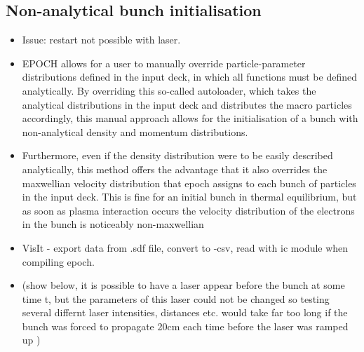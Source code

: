 
\subsection{Non-analytical bunch initialisation}
\begin{itemize}
\item Issue: restart not possible with laser. 
\item EPOCH allows for a user to manually override particle-parameter distributions defined in the input deck, in which all functions must be defined analytically. By overriding this so-called autoloader, which takes the analytical distributions in the input deck and distributes the macro particles accordingly, this manual approach allows for the initialisation of a bunch with non-analytical density and momentum distributions. 
\item Furthermore, even if the density distribution were to be easily described analytically, this method offers the advantage that it also overrides the maxwellian velocity distribution that epoch assigns to each bunch of particles in the input deck. This is fine for an initial bunch in thermal equilibrium, but as soon as plasma interaction occurs the velocity distribution of the electrons in the bunch is noticeably non-maxwellian
\item VisIt - export data from .sdf file, convert to -csv, read with ic module when compiling epoch.
\item (show below, it is possible to have a laser appear before the bunch at some time t, but the parameters of this laser could not be changed so testing several differnt laser intensities, distances etc. would take far too long if the bunch was forced to propagate 20cm each time before the laser was ramped up )
\end{itemize}



